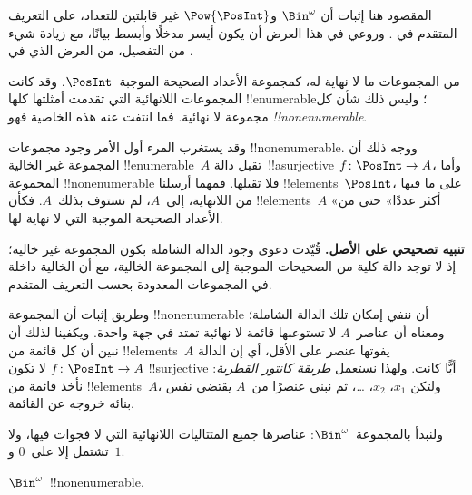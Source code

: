\documentclass[../../../include/open-logic-section]{subfiles}
\begin{document}


\begin{editorial}
المقصود هنا إثبات أن $\Bin^\omega$ و$\Pow{\PosInt}$ غير قابلتين للتعداد، على التعريف المتقدم في . وروعي في هذا العرض أن يكون أيسر مدخلًا وأبسط بيانًا، مع زيادة شيء من التفصيل، من العرض الذي في .
\end{editorial}

من المجموعات ما لا نهاية له، كمجموعة الأعداد الصحيحة الموجبة~$\PosInt$. وقد كانت المجموعات اللانهائية التي تقدمت أمثلتها كلها !!{enumerable}؛ وليس ذلك شأن كل مجموعة لا نهائية. فما انتفت عنه هذه الخاصية فهو \emph{!!{nonenumerable}}.

وقد يستغرب المرء أول الأمر وجود مجموعات !!{nonenumerable}. ووجه ذلك أن المجموعة غير الخالية !!{enumerable}~$A$ تقبل دالة~!!a{surjective} $f \colon \PosInt \to A$، وأما المجموعة !!{nonenumerable} فلا تقبلها. فمهما أرسلنا !!{element}s~$\PosInt$، على ما فيها من اللانهاية، إلى~$A$، لم نستوف بذلك~$A$. فكأن !!{element}s~$A$ «أكثر عددًا» حتى من الأعداد الصحيحة الموجبة التي لا نهاية لها.

\textbf{تنبيه تصحيحي على الأصل.} قُيّدت دعوى وجود الدالة الشاملة بكون
المجموعة غير خالية؛ إذ لا توجد دالة كلية من الصحيحات الموجبة إلى المجموعة الخالية،
مع أن الخالية داخلة في المجموعات المعدودة بحسب التعريف المتقدم.

وطريق إثبات أن المجموعة !!{nonenumerable} أن ننفي إمكان تلك الدالة الشاملة؛ ومعناه أن عناصر~$A$ لا تستوعبها قائمة لا نهائية تمتد في جهة واحدة. ويكفينا لذلك أن نبين أن كل قائمة من !!{element}s~$A$ يفوتها عنصر على الأقل، أي إن الدالة $f\colon \PosInt \to A$ لا تكون !!{surjective} أيًّا كانت. ولهذا نستعمل \emph{طريقة كانتور القطرية}: نأخذ قائمة من !!{element}s~$A$، ولتكن $x_1$، $x_2$، \dots، ثم نبني عنصرًا من~$A$ يقتضي نفس بنائه خروجه عن القائمة.

ولنبدأ بالمجموعة~$\Bin^\omega$: عناصرها جميع المتتاليات اللانهائية التي لا فجوات فيها، ولا تشتمل إلا على~$0$ و~$1$.

\begin{thm}
$\Bin^\omega$~!!{nonenumerable}.
\end{thm}
\end{document}
